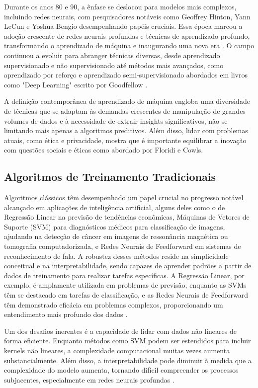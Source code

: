 Durante os anos 80 e 90, a ênfase se deslocou para modelos mais complexos, incluindo redes neurais, com pesquisadores notáveis como Geoffrey Hinton, Yann LeCun e Yoshua Bengio desempenhando papéis cruciais. Essa época marcou a adoção crescente de redes neurais profundas e técnicas de aprendizado profundo, transformando o aprendizado de máquina e inaugurando uma nova era \cite{hinton2012deep}. O campo continuou a evoluir para abranger técnicas diversas, desde aprendizado supervisionado e não supervisionado até métodos mais avançados, como aprendizado por reforço e aprendizado semi-supervisionado abordados em livros como "Deep Learning" escrito por Goodfellow \cite{goodfellow2016deep}.

A definição contemporânea de aprendizado de máquina engloba uma diversidade de técnicas que se adaptam às demandas crescentes de manipulação de grandes volumes de dados e à necessidade de extrair insights significativos, não se limitando mais apenas a algoritmos preditivos. Além disso, lidar com problemas atuais, como ética e privacidade, mostra que é importante equilibrar a inovação com questões sociais e éticas como abordado por Floridi e Cowls\cite{floridi2018ai}.

\subsection{Algoritmos de Treinamento Tradicionais}

Algoritmos clássicos têm desempenhado um papel crucial no progresso notável alcançado em aplicações de inteligência artificial, alguns deles como o de Regressão Linear na previsão de tendências econômicas, Máquinas de Vetores de Suporte (SVM) para diagnósticos médicos para classificação de imagens, ajudando na detecção de câncer em imagens de ressonância magnética ou tomografia computadorizada, e Redes Neurais de Feedforward em sistemas de reconhecimento de fala. A robustez desses métodos reside na simplicidade conceitual e na interpretabilidade, sendo capazes de aprender padrões a partir de dados de treinamento para realizar tarefas específicas. A Regressão Linear, por exemplo, é amplamente utilizada em problemas de previsão, enquanto as SVMs têm se destacado em tarefas de classificação, e as Redes Neurais de Feedforward têm demonstrado eficácia em problemas complexos, proporcionando um entendimento mais profundo dos dados \cite{bishop2006pattern} \cite{russell2016artificial}.

 Um dos desafios inerentes é a capacidade de lidar com dados não lineares de forma eficiente. Enquanto métodos como SVM podem ser estendidos para incluir kernels não lineares, a complexidade computacional muitas vezes aumenta substancialmente. Além disso, a interpretabilidade pode diminuir à medida que a complexidade do modelo aumenta, tornando difícil compreender os processos subjacentes, especialmente em redes neurais profundas \cite{goh2017deep}.

